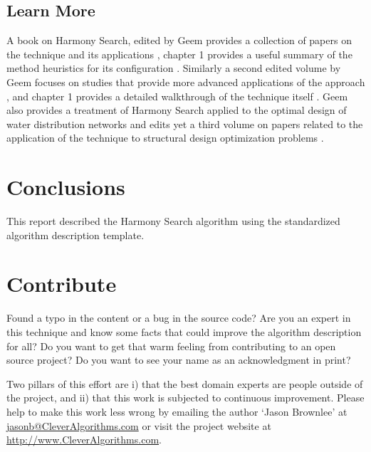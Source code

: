 \documentclass[a4paper, 11pt]{article}
\makeatletter
\newcommand{\myreportauthor}{Jason Brownlee}
\newcommand{\myreportemail}{jasonb@CleverAlgorithms.com}
\newcommand{\myreportwebsite}{http://www.CleverAlgorithms.com}
\makeatother
\begin{document}
\subsection{Learn More}
A book on Harmony Search, edited by Geem provides a collection of papers on the technique and its applications \cite{Geem2009}, chapter 1 provides a useful summary of the method heuristics for its configuration \cite{Yang2009}. Similarly a second edited volume by Geem focuses on studies that provide more advanced applications of the approach \cite{Geem2010}, and chapter 1 provides a detailed walkthrough of the technique itself \cite{Geem2010a}. Geem also provides a treatment of Harmony Search applied to the optimal design of water distribution networks \cite{Geem2009a} and edits yet a third volume on papers related to the application of the technique to structural design optimization problems \cite{Geem2009b}.

% 
% 
\section{Conclusions}
\label{sec:conclusions}
This report described the Harmony Search algorithm using the standardized algorithm description template.

% 
% 
\section{Contribute}
\label{sec:contribute}
Found a typo in the content or a bug in the source code? 
Are you an expert in this technique and know some facts that could improve the algorithm description for all?
Do you want to get that warm feeling from contributing to an open source project? 
Do you want to see your name as an acknowledgment in print?

Two pillars of this effort are i) that the best domain experts are people outside of the project, and ii) that this work is subjected to continuous improvement. 
Please help to make this work less wrong by emailing the author `\myreportauthor' at \url{\myreportemail} or visit the project website at \url{\myreportwebsite}.



\end{document}
